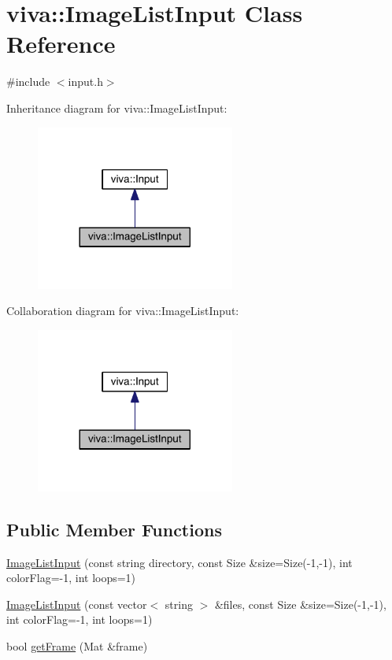 \hypertarget{classviva_1_1_image_list_input}{}\section{viva\+:\+:Image\+List\+Input Class Reference}
\label{classviva_1_1_image_list_input}


{\ttfamily \#include $<$input.\+h$>$}



Inheritance diagram for viva\+:\+:Image\+List\+Input\+:
\nopagebreak
\begin{figure}[H]
\begin{center}
\leavevmode
\includegraphics[width=185pt]{classviva_1_1_image_list_input__inherit__graph}
\end{center}
\end{figure}


Collaboration diagram for viva\+:\+:Image\+List\+Input\+:
\nopagebreak
\begin{figure}[H]
\begin{center}
\leavevmode
\includegraphics[width=185pt]{classviva_1_1_image_list_input__coll__graph}
\end{center}
\end{figure}
\subsection*{Public Member Functions}
\begin{DoxyCompactItemize}
\item 
\hyperlink{classviva_1_1_image_list_input_aedb635b2155c7e3b99c661c34bd73a4a}{Image\+List\+Input} (const string directory, const Size \&size=Size(-\/1,-\/1), int color\+Flag=-\/1, int loops=1)
\item 
\hyperlink{classviva_1_1_image_list_input_a50fecca0d1f38b8ec70d9da362d72975}{Image\+List\+Input} (const vector$<$ string $>$ \&files, const Size \&size=Size(-\/1,-\/1), int color\+Flag=-\/1, int loops=1)
\item 
bool \hyperlink{classviva_1_1_image_list_input_a0e5759331fb604e55178560de816dbd6}{get\+Frame} (Mat \&frame)
\end{DoxyCompactItemize}
